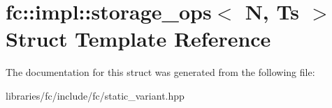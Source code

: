 \hypertarget{structfc_1_1impl_1_1storage__ops}{}\section{fc\+:\+:impl\+:\+:storage\+\_\+ops$<$ N, Ts $>$ Struct Template Reference}
\label{structfc_1_1impl_1_1storage__ops}


The documentation for this struct was generated from the following file\+:\begin{DoxyCompactItemize}
\item 
libraries/fc/include/fc/static\+\_\+variant.\+hpp\end{DoxyCompactItemize}
